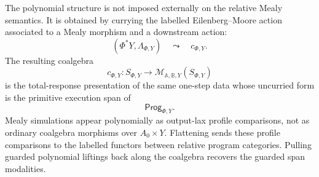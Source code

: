 \begin{remark}
\label{rem:poly-relative-final-summary}
The polynomial structure is not imposed externally on the relative Mealy
semantics.  It is obtained by currying the labelled Eilenberg--Moore action
associated to a Mealy morphism and a downstream action:
\[
(\Phi^\ast Y,\Lambda_{\Phi,Y})
\quad\leadsto\quad
c_{\Phi,Y}.
\]
The resulting coalgebra
\[
c_{\Phi,Y}:
S_{\Phi,Y}\to
\mathcal M_{\mathbb A,\mathbb B,Y}(S_{\Phi,Y})
\]
is the total-response presentation of the same one-step data whose uncurried
form is the primitive execution span of
\[
\mathsf{Prog}_{\Phi,Y}.
\]
Mealy simulations appear polynomially as output-lax profile comparisons, not
as ordinary coalgebra morphisms over \(A_0\times Y\).  Flattening sends these
profile comparisons to the labelled functors between relative program
categories.  Pulling guarded polynomial liftings back along the coalgebra
recovers the guarded span modalities.
\end{remark}